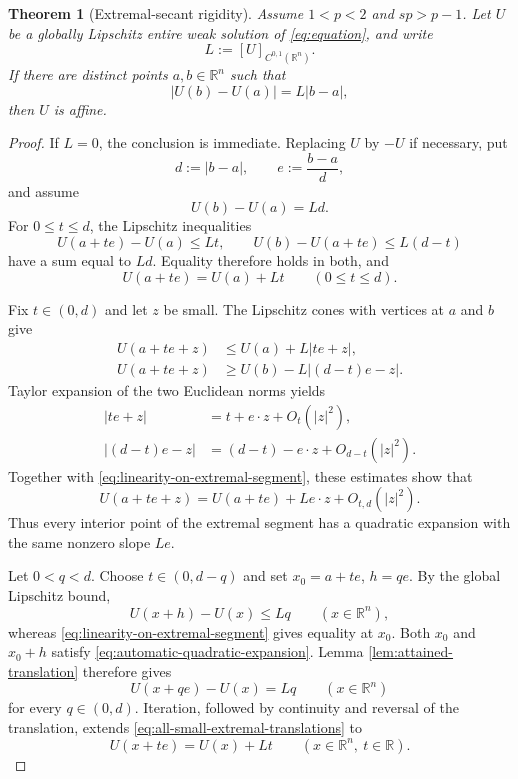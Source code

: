 \documentclass[11pt,reqno]{amsart}
\numberwithin{equation}{section}
\newcommand{\R}{\mathbb R}
\newtheorem{theorem}{Theorem}[section]
\theoremstyle{remark}
\begin{document}
\begin{theorem}[Extremal-secant rigidity]
\label{thm:extremal-secant-rigidity}
Assume $1<p<2$ and $sp>p-1$.  Let $U$ be a globally Lipschitz entire
weak solution of \eqref{eq:equation}, and write
\[
 L:=[U]_{C^{0,1}(\R^n)}.
\]
If there are distinct points $a,b\in\R^n$ such that
\begin{equation*}
 |U(b)-U(a)|=L|b-a|,
\end{equation*}
then $U$ is affine.
\end{theorem}

\begin{proof}
If $L=0$, the conclusion is immediate.  Replacing $U$ by $-U$ if
necessary, put
\[
 d:=|b-a|,\qquad e:=\frac{b-a}{d},
\]
and assume
\[
 U(b)-U(a)=Ld.
\]
For $0\le t\le d$, the Lipschitz inequalities
\[
 U(a+te)-U(a)\le Lt,
 \qquad
 U(b)-U(a+te)\le L(d-t)
\]
have a sum equal to $Ld$.  Equality therefore holds in both, and
\begin{equation}
 U(a+te)=U(a)+Lt
 \qquad(0\le t\le d).
 \label{eq:linearity-on-extremal-segment}
\end{equation}

Fix $t\in(0,d)$ and let $z$ be small.  The Lipschitz cones with vertices
at $a$ and $b$ give
\begin{align*}
 U(a+te+z)
 &\le U(a)+L|te+z|,\\
 U(a+te+z)
 &\ge U(b)-L|(d-t)e-z|.
\end{align*}
Taylor expansion of the two Euclidean norms yields
\begin{align*}
 |te+z|&=t+e\cdot z+O_t(|z|^2),\\
 |(d-t)e-z|&=(d-t)-e\cdot z+O_{d-t}(|z|^2).
\end{align*}
Together with \eqref{eq:linearity-on-extremal-segment}, these estimates
show that
\begin{equation}
 U(a+te+z)=U(a+te)+Le\cdot z+O_{t,d}(|z|^2).
 \label{eq:automatic-quadratic-expansion}
\end{equation}
Thus every interior point of the extremal segment has a quadratic
expansion with the same nonzero slope $Le$.

Let $0<q<d$.  Choose $t\in(0,d-q)$ and set
$x_0=a+te$, $h=qe$.  By the global Lipschitz bound,
\[
 U(x+h)-U(x)\le Lq\qquad(x\in\R^n),
\]
whereas \eqref{eq:linearity-on-extremal-segment} gives equality at
$x_0$.  Both $x_0$ and $x_0+h$ satisfy
\eqref{eq:automatic-quadratic-expansion}.  Lemma
\ref{lem:attained-translation} therefore gives
\begin{equation}
 U(x+qe)-U(x)=Lq
 \qquad(x\in\R^n)
 \label{eq:all-small-extremal-translations}
\end{equation}
for every $q\in(0,d)$.  Iteration, followed by continuity and reversal
of the translation, extends \eqref{eq:all-small-extremal-translations}
to
\begin{equation}
 U(x+te)=U(x)+Lt
 \qquad(x\in\R^n,\ t\in\R).
 \label{eq:global-extremal-direction}
\end{equation}


\end{proof}
\end{document}
